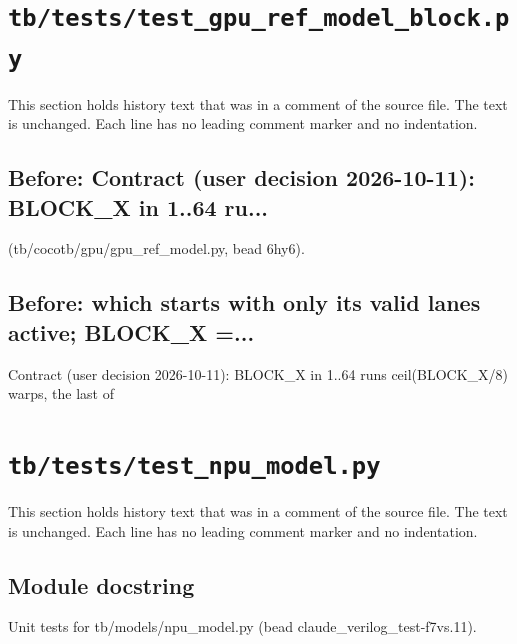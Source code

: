 \section{\texttt{tb/tests/test\_gpu\_ref\_model\_block.py}}\label{cr:suite:test-gpu-ref-model-block}

This section holds history text that was in a comment of the source file. The text is unchanged. Each line has no leading comment marker and no indentation.

\begin{record}

\subsection*{Before: Contract (user decision 2026-10-11): BLOCK\_X in 1..64 ru...}

\begin{textblock}
(tb/cocotb/gpu/gpu_ref_model.py, bead 6hy6).
\end{textblock}

\subsection*{Before: which starts with only its valid lanes active; BLOCK\_X =...}

\begin{textblock}
Contract (user decision 2026-10-11): BLOCK_X in 1..64 runs ceil(BLOCK_X/8) warps, the last of
\end{textblock}

\end{record}

\section{\texttt{tb/tests/test\_npu\_model.py}}\label{cr:suite:test-npu-model}

This section holds history text that was in a comment of the source file. The text is unchanged. Each line has no leading comment marker and no indentation.

\begin{record}

\subsection*{Module docstring}

\begin{textblock}
Unit tests for tb/models/npu_model.py (bead claude_verilog_test-f7vs.11).
\end{textblock}

\end{record}

